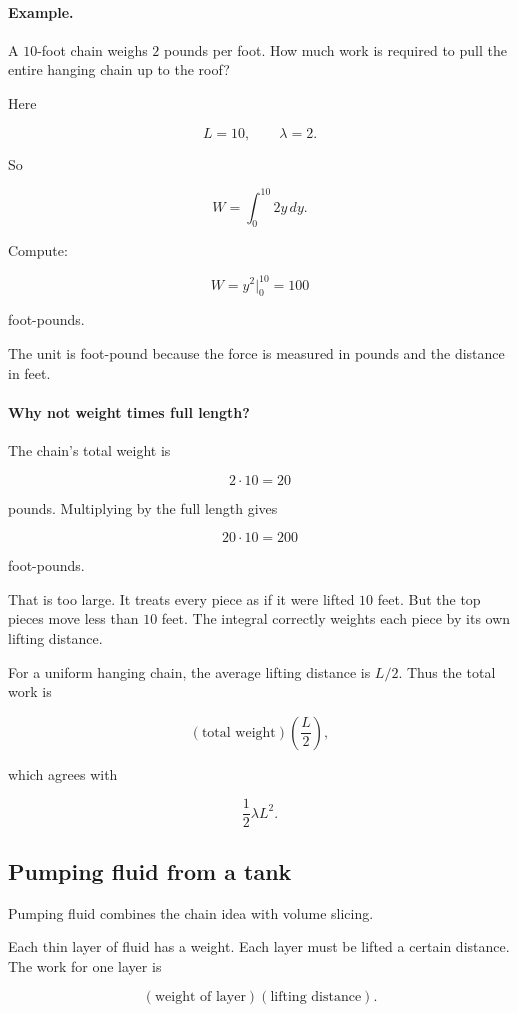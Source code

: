 \paragraph{Example.}
A \(10\)-foot chain weighs \(2\) pounds per foot.  How much work is required to pull
the entire hanging chain up to the roof?

Here

\[
L=10,
\qquad
\lambda=2.
\]

So

\[
W=\int_0^{10} 2y\,dy.
\]

Compute:

\[
W=
y^2\Big|_0^{10}
=
\boxed{100}
\]

foot-pounds.

The unit is foot-pound because the force is measured in pounds and the distance in feet.

\paragraph{Why not weight times full length?}
The chain's total weight is

\[
2\cdot10=20
\]

pounds.  Multiplying by the full length gives

\[
20\cdot10=200
\]

foot-pounds.

That is too large.  It treats every piece as if it were lifted \(10\) feet.  But the top
pieces move less than \(10\) feet.  The integral correctly weights each piece by its own
lifting distance.

For a uniform hanging chain, the average lifting distance is \(L/2\).  Thus the total work is

\[
(\text{total weight})\left(\frac{L}{2}\right),
\]

which agrees with

\[
\frac12\lambda L^2.
\]

\subsection{Pumping fluid from a tank}
\label{subsec:pumping-fluid-tank}

Pumping fluid combines the chain idea with volume slicing.

Each thin layer of fluid has a weight.  Each layer must be lifted a certain distance.
The work for one layer is

\[
(\text{weight of layer})(\text{lifting distance}).
\]

